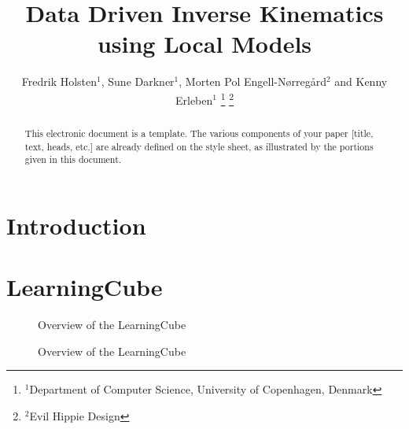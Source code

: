 \documentclass[letterpaper, 10 pt, conference]{ieeeconf}  %
\title{\LARGE \bf
Data Driven Inverse Kinematics using Local Models
}
\author{Fredrik Holsten$^{1}$, Sune Darkner$^{1}$, Morten Pol Engell-Nørregård$^{2}$ and Kenny Erleben$^{1}$%
\thanks{$^{1}$Department of Computer Science, University of Copenhagen, Denmark}%
\thanks{$^{2}$Evil Hippie Design}%
}
\begin{document}
\maketitle
\thispagestyle{empty}
\pagestyle{empty}


\begin{abstract}

This electronic document is a template. The various components of your paper [title, text, heads, etc.] are already defined on the style sheet, as illustrated by the portions given in this document.

\end{abstract}



\section{Introduction}

\section{LearningCube}
\begin{figure}[thpb]
      \centering
        \caption{Overview of the LearningCube}
        \label{fig:cube}
\end{figure}

\begin{figure}[thpb]
      \centering
        \caption{Overview of the LearningCube}
        \label{fig:cube}
\end{figure}
\end{document}
